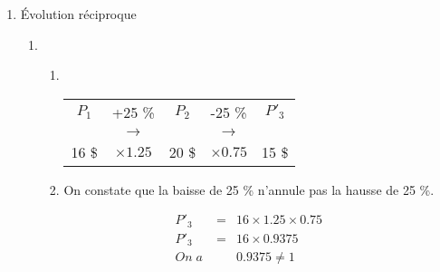 \documentclass[12pt,a4paper]{article}
\begin{document}
\begin{enumerate}[label=\Alph*.]
\begin{enumerate}[label=\arabic*)]
			On peut aussi calculer indépendamment des prix : $\num{1.25} \times \num{1.30} = \num{1.625}$, soit une hausse globale de \num{62.5} \%.\\
			
			\begin{myrem}
				Le pourcentage de hausse globale \num{62.5} \% n'est pas égal à la somme des deux pourcentages de hausse successives \num{25} \% et \num{30} \%, car ces deux pourcentages ne s'appliquent pas sur le même prix, donc ne s'additionnent pas.
			\end{myrem}
			
			\begin{mybilan2}{\'Evolutions successives}
				Deux évolutions (hausse ou baisse) successives de coefficients multiplicateurs $c$ et $c'$  correspondent  une évolution globale (hausse ou baisse) de $c \times c'$ (on multiplie).
			\end{mybilan2}
		\end{enumerate}
		
		\item \'Evolution réciproque
			\begin{enumerate}[label=\arabic*)]
				\item 
					\begin{enumerate}[label=\alph*)]
						\item \ 
							\begin{table}[h!]
								\centering{\ }
								\begin{tabular}{|@{\ \ }c@{\ \ }c@{\ \ }c@{\ \ }c@{\ \ }c@{\ \ }|}
									\hline
									$P_1$ & +\num{25} \%  & $P_2$ & -\num{25} \%  & $P'_3$ \\
									& {\LARGE$\rightarrow$} &	&	 {\LARGE$\rightarrow$} &	\\
									\num{16} \$ & $\times \num{1.25} $ & 20 \$ &  $\times \num{0.75}$ & \num{15} \$ \\
									\hline
								\end{tabular}
								
							\end{table}
							
						\item On constate que la baisse de \num{25} \% n'annule pas la hausse de \num{25} \%.
					\end{enumerate}
					
					\begin{myrem}
						\begin{eqnarray*}
							P'_3 &=& \num{16} \times \num{1.25} \times \num{0.75} \\
							 P'_3 &=& \num{16} \times \num{0.9375} \\
							 On\;a\; & &\num{0.9375} \neq 1
						\end{eqnarray*}
					\end{myrem}
					

\end{enumerate}
\end{enumerate}
\end{document}
